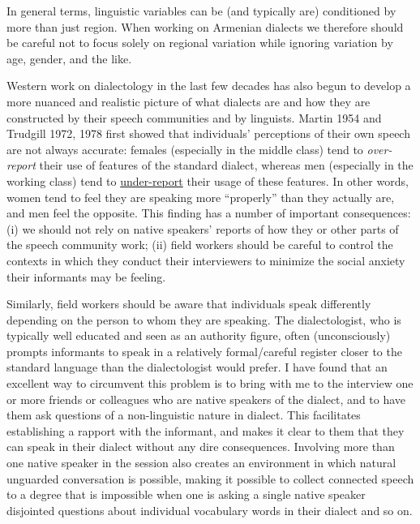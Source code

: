 In general terms, linguistic variables can be (and typically are) conditioned by more than just region. When working on Armenian dialects we therefore should be careful not to focus solely on regional variation while ignoring variation by age, gender, and the like.


Western work on dialectology in the last few decades has also begun to develop a more nuanced and realistic picture of what dialects are and how they are constructed by their speech communities and by linguists. Martin 1954 and Trudgill 1972, 1978 first showed that individuals’ perceptions of their own speech are not always accurate: females (especially in the middle class) tend to \textit{over-report} their use of features of the standard dialect, whereas men (especially in the working class) tend to \underline{under-report} their usage of these features. In other words, women tend to feel they are speaking more “properly” than they actually are, and men feel the opposite. This finding has a number of important consequences: (i) we should not rely on native speakers’ reports of how they or other parts of the speech community work; (ii) field workers should be careful to control the contexts in which they conduct their interviewers to minimize the social anxiety their informants may be feeling.

Similarly, field workers should be aware that individuals speak differently depending on the person to whom they are speaking. The dialectologist, who is typically well educated and seen as an authority figure, often (unconsciously) prompts informants to speak in a relatively formal/careful register closer to the standard language than the dialectologist would prefer. I have found that an excellent way to circumvent this problem is to bring with me to the interview one or more friends or colleagues who are native speakers of the dialect, and to have them ask questions of a non-linguistic nature in dialect. This facilitates establishing a rapport with the informant, and makes it clear to them that they can speak in their dialect without any dire consequences. Involving more than one native speaker in the session also creates an environment in which natural unguarded conversation is possible, making it possible to collect connected speech to a degree that is impossible when one is asking a single native speaker disjointed questions about individual vocabulary words in their dialect and so on.


